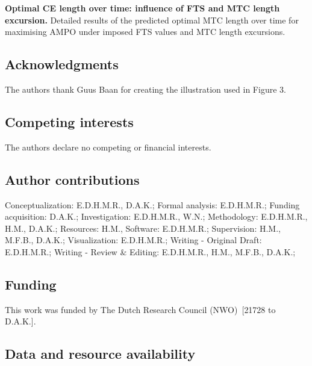 \documentclass[
  10pt,
  letterpaper,
]{article}
\begin{document}
\label{S3_File} \textbf{Optimal CE length over time: influence of FTS
and MTC length excursion.} Detailed results of the predicted optimal MTC
length over time for maximising AMPO under imposed FTS values and MTC
length excursions.


\subsection*{Acknowledgments}\label{acknowledgments}

The authors thank Guus Baan for creating the illustration used in Figure
3.


\subsection*{Competing interests}\label{competing-interests}

The authors declare no competing or financial interests.


\subsection*{Author contributions}\label{author-contributions}

Conceptualization: E.D.H.M.R., D.A.K.; Formal analysis: E.D.H.M.R.;
Funding acquisition: D.A.K.; Investigation: E.D.H.M.R., W.N.;
Methodology: E.D.H.M.R., H.M., D.A.K.; Resources: H.M., Software:
E.D.H.M.R.; Supervision: H.M., M.F.B., D.A.K.; Visualization:
E.D.H.M.R.; Writing - Original Draft: E.D.H.M.R.; Writing - Review \&
Editing: E.D.H.M.R., H.M., M.F.B., D.A.K.;


\subsection*{Funding}\label{funding}

This work was funded by The Dutch Research Council (NWO)~{[}21728 to
D.A.K.{]}.


\subsection*{Data and resource
availability}\label{data-and-resource-availability}
\end{document}
